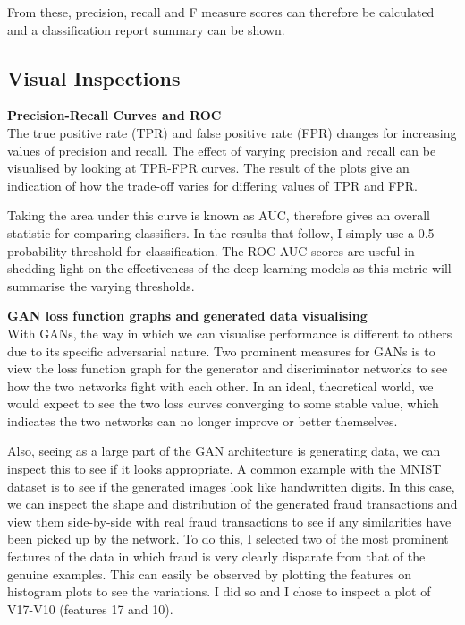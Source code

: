 \documentclass[12pt,a4paper,twoside]{report}
\begin{document}
From these, precision, recall and F measure scores can therefore be calculated and a classification report summary can be shown. 

\subsection{Visual Inspections}

\textbf{Precision-Recall Curves and ROC}\\
The true positive rate (TPR) and false positive rate (FPR) changes for increasing values of precision and recall. The effect of varying precision and recall can be visualised by looking at TPR-FPR curves. The result of the plots give an indication of how the trade-off varies for differing values of TPR and FPR.

Taking the area under this curve is known as AUC, therefore gives an overall statistic for comparing classifiers. In the results that follow, I simply use a 0.5 probability threshold for classification. The ROC-AUC scores are useful in shedding light on the effectiveness of the deep learning models as this metric will summarise the varying thresholds.

\textbf{GAN loss function graphs and generated data visualising}\\
With GANs, the way in which we can visualise performance is different to others due to its specific adversarial nature. Two prominent measures for GANs is to view the loss function graph for the generator and discriminator networks to see how the two networks fight with each other. In an ideal, theoretical world, we would expect to see the two loss curves converging to some stable value, which indicates the two networks can no longer improve or better themselves. 

Also, seeing as a large part of the GAN architecture is generating data, we can inspect this to see if it looks appropriate. A common example with the MNIST dataset is to see if the generated images look like handwritten digits. In this case, we can inspect the shape and distribution of the generated fraud transactions and view them side-by-side with real fraud transactions to see if any similarities have been picked up by the network. To do this, I selected two of the most prominent features of the data in which fraud is very clearly disparate from that of the genuine examples. This can easily be observed by plotting the features on histogram plots to see the variations. I did so and I chose to inspect a plot of V17-V10 (features 17 and 10).
\end{document}

